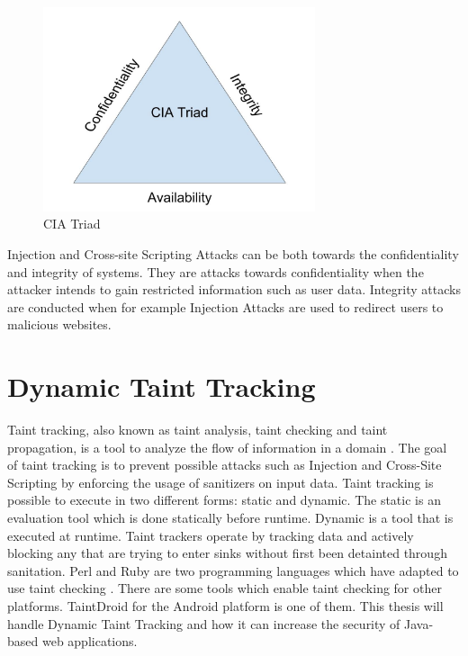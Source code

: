 \begin{figure}
    \centering
    \includegraphics[height=6cm]{images/CIATriad.jpg}
    \caption{CIA Triad}
    \label{fig:CIATriad}
\end{figure}

Injection and Cross-site Scripting Attacks can be both towards the confidentiality and integrity of systems. They are attacks towards confidentiality when the attacker intends to gain restricted information such as user data. Integrity attacks are conducted when for example Injection Attacks are used to redirect users to malicious websites.



\section{Dynamic Taint Tracking}
\label{DynamicTaintTracking}
Taint tracking, also known as taint analysis, taint checking and taint propagation, is a tool to analyze the flow of information in a domain \parencite{Pan2015}. The goal of taint tracking is to prevent possible attacks such as Injection and Cross-Site Scripting by enforcing the usage of sanitizers on input data. Taint tracking is possible to execute in two different forms: static and dynamic. The static is an evaluation tool which is done statically before runtime. Dynamic is a tool that is executed at runtime. Taint trackers operate by tracking data and actively blocking any that are trying to enter sinks without first been detainted through sanitation. Perl and Ruby are two programming languages which have adapted to use taint checking \parencite{perl, ruby}. There are some tools which enable taint checking for other platforms. TaintDroid \parencite{Ma2010} for the Android platform is one of them. This thesis will handle Dynamic Taint Tracking and how it can increase the security of Java-based web applications.

